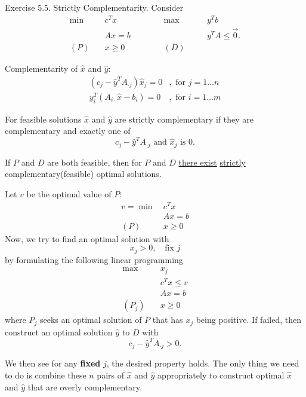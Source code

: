 \begin{eg}
	Exercise 5.5.  Strictly Complementarity.
	Consider
	\[
		\begin{alignedat}{5}
			\min~&c^{T}x\qquad\qquad&&\max ~&&y^{T}b\\
			&Ax = b 				&&		&&y^{T}A\leq \vec{0}.\\
			(P)\quad	&x\geq  0 	&&(D)\quad&&
		\end{alignedat}
	\]
	\begin{prev}
		Complementarity of \(\hat{x}\) and \(\hat{y}\)\(\colon\)
		\[
			\begin{split}
				(c_{j} - \hat{y}^{T} A_{\cdot j}) \hat{x}_j = 0&, \text{ for }j = 1\ldots n\\
				y^{T}_i (A_{i\cdot}\hat{x} - b_{i}) = 0&, \text{ for } i = 1\ldots m
			\end{split}
		\]
	\end{prev}

	\begin{definition}
		For feasible solutions \(\hat{x}\) and \(\hat{y}\) are strictly complementary if they are complementary and exactly one of
		\[
			c_{j} - \hat{y}^{T}A_{\cdot j}\text{ and }\hat{x}_j \text{ is } 0.
		\]
	\end{definition}

	\begin{theorem}
		If \(P\) and \(D\) are both feasible, then for \(P\) and \(D\) \underline{there exist} \underline{strictly}
		complementary(feasible) optimal solutions.
	\end{theorem}

	\begin{intuition}
		Let \(v\) be the optimal value of \(P\)\(\colon\)
		\begin{align*}
			v = \min~ & c^Tx    \\
			          & Ax = b  \\
			(P)\quad  & x\geq 0
		\end{align*}
		Now, we try to find an optimal solution with
		\[
			x_{j}>0, \quad \text{fix }j
		\]
		by formulating the following linear programming
		\begin{align*}
			\max~      & x_{j}        \\
			           & c^{T}x\leq v \\
			           & Ax = b       \\
			(P_j)\quad & x\geq  0
		\end{align*}
		where \(P_{j}\) seeks an optimal solution of \(P\) that has \(x_{j}\) being positive. If failed, then construct an optimal solution \(\hat{y}\) to \(D\) with
		\[
			c_{j} - \hat{y}^{T} A_{\cdot j}>0.
		\]

		We then see for any \textbf{fixed} \(j\), the desired property holds. The only thing we need to do is combine these \(n\) pairs of \(\hat{x}\) and \(\hat{y}\)
		appropriately to construct optimal \(\hat{x}\) and \(\hat{y}\) that are overly complementary.
	\end{intuition}
\end{eg}